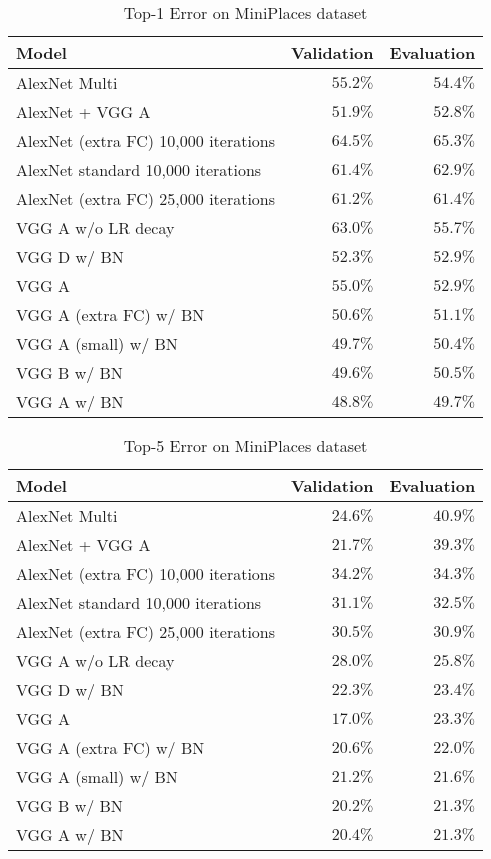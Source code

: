 \documentclass[10pt,twocolumn,letterpaper]{article}
\begin{document}
\begin{table}[th]
  \caption{Top-1 Error on MiniPlaces dataset}
  \label{tab:top1_results}
  \centering
  \begin{tabular}{ l | r | r }
    \toprule
    Model & Validation & Evaluation \\
    \midrule
    AlexNet Multi & $55.2\%$ & $54.4\%$ \\
    AlexNet + VGG A & $51.9\%$ & $52.8\%$ \\
    AlexNet (extra FC) 10,000 iterations  & $64.5\%$ & $65.3\%$ \\
    AlexNet standard 10,000 iterations & $61.4\%$ & $62.9\%$ \\
    AlexNet (extra FC) 25,000 iterations & $61.2\%$ & $61.4\%$ \\
    VGG A w/o LR decay & $63.0\%$ & $55.7\%$ \\
    VGG D w/ BN & $52.3\%$ & $52.9\%$ \\
    VGG A & $55.0\%$ & $52.9\%$ \\
    VGG A (extra FC) w/ BN & $50.6\%$ & $51.1\%$ \\
    VGG A (small) w/ BN & $49.7\%$ & $50.4\%$ \\
    VGG B w/ BN & $49.6\%$ & $50.5\%$ \\
    VGG A w/ BN & $\mathbf{48.8\%}$ & $\mathbf{49.7\%}$ \\
    \bottomrule
  \end{tabular}
\end{table}

\begin{table}[th]
  \caption{Top-5 Error on MiniPlaces dataset}
  \label{tab:top5_results}
  \centering
  \begin{tabular}{ l | r | r }
    \toprule
    Model & Validation & Evaluation \\
    \midrule
    AlexNet Multi & $24.6\%$ & $40.9\%$ \\
    AlexNet + VGG A & $21.7\%$ & $39.3\%$ \\
    AlexNet (extra FC) 10,000 iterations & $34.2\%$ & $34.3\%$ \\
    AlexNet standard 10,000 iterations & $31.1\%$ & $32.5\%$ \\
    AlexNet (extra FC) 25,000 iterations & $30.5\%$ & $30.9\%$ \\
    VGG A w/o LR decay & $28.0\%$ & $25.8\%$ \\
    VGG D w/ BN & $22.3\%$ & $23.4\%$ \\
    VGG A & $17.0\%$ & $23.3\%$ \\
    VGG A (extra FC) w/ BN & $20.6\%$ & $22.0\%$ \\
    VGG A (small) w/ BN & $21.2\%$ & $21.6\%$ \\
    VGG B w/ BN & $\mathbf{20.2\%}$ & $21.3\%$ \\
    VGG A w/ BN & $20.4\%$ & $\mathbf{21.3\%}$ \\
    \bottomrule
  \end{tabular}
\end{table}
\end{document}
